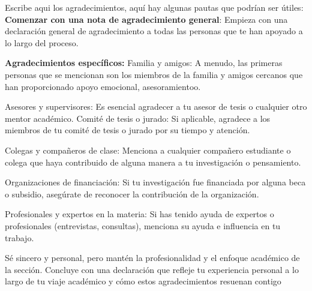 
\agradecimientos  %
{%
Escribe aqui los agradecimientos, aquí hay algunas pautas que podrían ser útiles:
\textbf{Comenzar con una nota de agradecimiento general}: Empieza con una declaración general de agradecimiento a todas las personas que te han apoyado a lo largo del proceso.

\textbf{Agradecimientos específicos:}
Familia y amigos: A menudo, las primeras personas que se mencionan son los miembros de la familia y amigos cercanos que han proporcionado apoyo emocional, asesoramientoo.

Asesores y supervisores: Es esencial agradecer a tu asesor de tesis o cualquier otro mentor académico. 
Comité de tesis o jurado: Si aplicable, agradece a los miembros de tu comité de tesis o jurado por su tiempo y atención.

Colegas y compañeros de clase: Menciona a cualquier compañero estudiante o colega que haya contribuido de alguna manera a tu investigación o pensamiento.

Organizaciones de financiación: Si tu investigación fue financiada por alguna beca o subsidio, asegúrate de reconocer la contribución de la organización.

Profesionales y expertos en la materia: Si has tenido ayuda de expertos o profesionales (entrevistas, consultas), menciona su ayuda e influencia en tu trabajo.


Sé sincero y personal, pero mantén la profesionalidad y el enfoque académico de la sección.
Concluye con una declaración que refleje tu experiencia personal a lo largo de tu viaje académico y cómo estos agradecimientos resuenan contigo

} %
